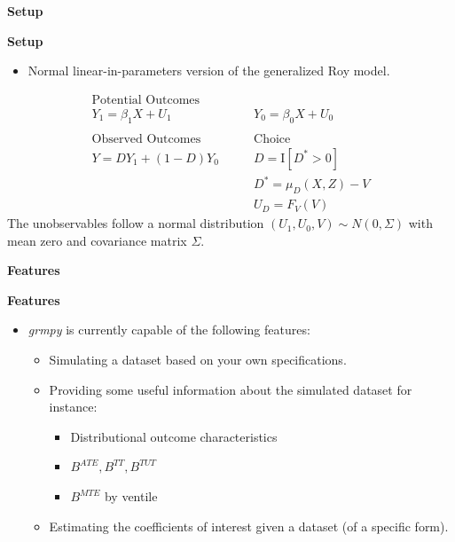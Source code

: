 \begin{frame}\begin{center}
\LARGE\textbf{Setup}
\end{center}\end{frame}



\begin{frame}
\textbf{Setup}

\medskip
\begin{itemize}\setlength\itemsep{1em}
\item Normal linear-in-parameters version of the generalized Roy model.
\end{itemize}
\begin{align*}
\text{Potential Outcomes} &\qquad \\
Y_1 = \beta_1 X + U_1      &\qquad Y_0 = \beta_0 X + U_0 \\
    & \\
\text{Observed Outcomes}  &\qquad \text{Choice} \\
Y = D Y_1 + (1 - D)Y_0 &\qquad D = \mathrm{I}[D^{*} > 0] \\
                       &\qquad D^{*} = \mu_D(X, Z) - V \\
                       &\qquad U_D = F_V(V)
\end{align*}
The unobservables follow a normal distribution $(U_1, U_0, V) \sim N(0, \Sigma)$ with mean zero and covariance matrix $\Sigma$. 
\end{frame}

\begin{frame}\begin{center}
\LARGE\textbf{Features}
\end{center}\end{frame}

\begin{frame}
\textbf{Features}

\medskip
\begin{itemize}\setlength\itemsep{1em}
\item \textit{grmpy} is currently capable of the following features:
\begin{itemize}\setlength\itemsep{1em}
  \item Simulating a dataset based on your own specifications.
  \item Providing some useful information about the simulated dataset for instance:
  
  \medskip
    \begin{itemize}\setlength\itemsep{1em}
    \item Distributional outcome characteristics
    \item $B^{ATE}, B^{TT}, B^{TUT}$
    \item $B^{MTE}$ by ventile
    \end{itemize}
  \item Estimating the coefficients of interest given a dataset (of a specific form).
\end{itemize}
\end{itemize}

\end{frame}

